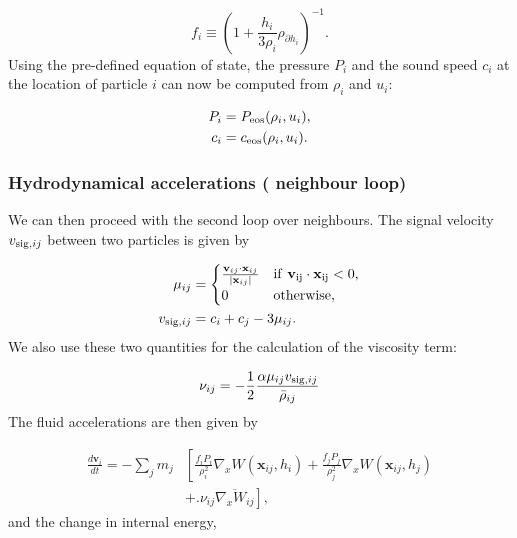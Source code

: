 \documentclass[fleqn, usenatbib, useAMS, a4paper]{mnras}
\renewcommand{\vec}[1]{{\mathbf{#1}}}
\newcommand{\Wij}{\overline{\nabla_xW_{ij}}}
\begin{document}
\begin{equation}
  f_i \equiv \left(1 + \frac{h_i}{3\rho_i}\rho_{\partial h_i}
  \right)^{-1}.
  \label{eq:sph:minimal:f_i}
\end{equation}
Using the pre-defined equation of state, the pressure $P_i$ and the sound
speed $c_i$ at the location of particle $i$ can now be computed from
$\rho_i$ and $u_i$:

\begin{align}
  P_i &= P_{\rm eos}(\rho_i, u_i),   \label{eq:sph:minimal:P}\\
  c_i &= c_{\rm eos}(\rho_i, u_i).   \label{eq:sph:minimal:c}
\end{align}

\subsubsection{Hydrodynamical accelerations ( neighbour loop)}

We can then proceed with the second loop over
neighbours. The signal velocity $v_{{\rm sig},ij}$ between two particles is given by

\begin{align}
  \mu_{ij} &=
  \begin{cases}
  \frac{\vec{v}_{ij} \cdot \vec{x}_{ij}}{|\vec{x}_{ij}|}  & \rm{if}~
  \vec{v}_{ij} \cdot \vec{x}_{ij} < 0,\\
    0 &\rm{otherwise}, \\
  \end{cases}\nonumber\\
  v_{{\rm sig},ij} &= c_i + c_j - 3\mu_{ij}.   \label{eq:sph:minimal:v_sig}
\end{align}
We also use these two quantities for the calculation of the viscosity term:

\begin{equation}
\nu_{ij} = -\frac{1}{2}\frac{\alpha \mu_{ij} v_{{\rm
      sig},ij}}{\bar\rho_{ij}}
  \label{eq:sph:minimal:nu_ij}
\end{equation}
The fluid accelerations are then given by

\begin{align}
  \frac{d\vec{v}_i}{dt} = -\sum_j m_j &\left[\frac{f_iP_i}{\rho_i^2}
  \nabla_x W(\vec{x}_{ij}, h_i)   \nonumber
  +\frac{f_jP_j}{\rho_j^2}\nabla_x W(\vec{x}_{ij},h_j)\right. \\
  &+ \left. \bigg.\nu_{ij} \Wij \right], \label{eq:sph:minimal:dv_dt}
\end{align}
and the change in internal energy,
\end{document}
